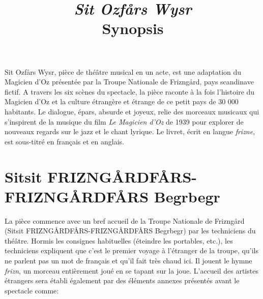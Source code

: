 \documentclass[a4paper]{article}
\title{\emph{Sit Ozfårs Wysr} \\ Synopsis}
\author{}
\date{}
\newcommand{\mssection}[1]{\section{#1}}
\begin{document}
\maketitle
Sit Ozfårs Wysr, pièce de théâtre musical en un acte, est une adaptation du Magicien d'Oz
présentée par la Troupe Nationale de Frizngård, pays scandinave fictif.  A
travers les six scènes du spectacle, la pièce raconte à la fois l'histoire du Magicien
d'Oz et la culture étrangère et étrange de ce petit pays de 30 000
habitants. Le dialogue, épars, absurde et joyeux, relie des morceaux
musicaux qui s'inspirent de la musique du film \emph{Le Magicien d'Oz} de
1939 pour explorer de nouveaux regards sur le jazz et le chant lyrique. Le
livret, écrit en langue \emph{frizne}, est sous-titré en français et en
anglais.
\mssection{Sitsit FRIZN\-GÅRD\-FÅRS-FRIZN\-GÅRD\-FÅRS Begrbegr}
La pièce commence avec un bref accueil de la Troupe Nationale de Frizngård
(Sitsit FRIZN\-GÅRD\-FÅRS-FRIZN\-GÅRD\-FÅRS Begrbegr) par les techniciens du
théâtre.
Hormis les consignes habituelles (éteindre les portables, etc.), les
techniciens
expliquent que c'est le premier voyage à l'étranger de la troupe, qu'ils ne
parlent pas un mot de français et qu'il fait très chaud ici. Il jouent
le hymne \emph{frizn}, un morceau entièrement joué en se tapant sur la
joue. L'accueil des artistes étrangers sera établi également
par des éléments annexes présentés avant le spectacle comme:
\end{document}
